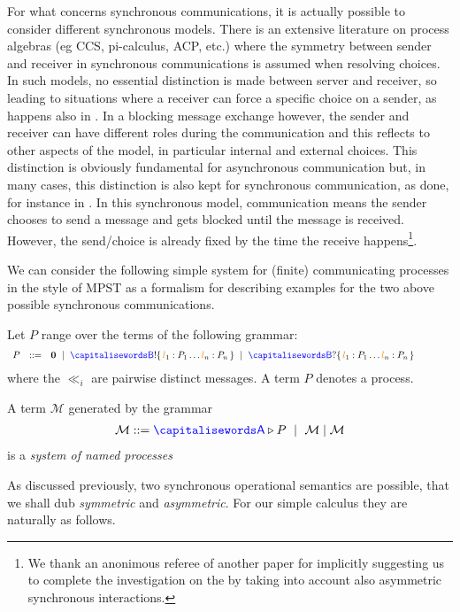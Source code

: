 
For what concerns synchronous communications, it is actually possible to consider different synchronous models.
There is an extensive literature on process algebras (eg CCS, pi-calculus, ACP, etc.) where the symmetry between sender and receiver in synchronous communications is assumed when resolving choices. In such models, no essential distinction is made between server and receiver,  so leading to situations where a receiver can force a specific choice on a sender, as happens also in  \cite{BLT20b}.
In a blocking message exchange however, the sender and receiver can have different roles during the communication and this reflects to other aspects of the model, in particular internal and external choices. This distinction is obviously fundamental for asynchronous communication but, in many cases, this distinction is also kept for synchronous communication, as done, for instance in \cite{aey03}.
 In this synchronous model,  communication means the sender chooses to send a message and gets blocked until the message is received. However, the send/choice is already fixed by the time the receive happens\footnote{We thank an anonimous referee of another paper for implicitly suggesting
 us to complete the investigation on the 
by taking into account also  asymmetric synchronous interactions.}.

We can consider the following simple system for (finite) communicating processes in the style of MPST
as a formalism for describing 
examples for the two above possible synchronous communications. 

 Let $P$ range over the terms of the following grammar:
  \begin{align*}
	 \begin{array}{lll@{\qquad\qquad}lll}
		P   &   ::=  & \mathbf{0}\   \mid\  \q!\Set{\al_1:P_1\ldots \al_n:P_n }
		\ \mid\  \q?\Set{\al_1:P_1\ldots \al_n:P_n }
	 \end{array}
  \end{align*}
  where the  $\ll_i$ are pairwise distinct messages. A term $P$ denotes a process.
 
   A term $\mathcal{M}$ generated by the grammar
	 \begin{align*}
	 \mathcal{M}  ::={\p}\triangleright  P\ \mid\  \mathcal{M} \mid \mathcal{M}
	 \end{align*}
  is a \emph{system of named processes}
  
As discussed previously, two synchronous operational semantics are possible, that we shall dub
{\em symmetric} and {\em asymmetric}. For our simple calculus they are naturally as follows.


